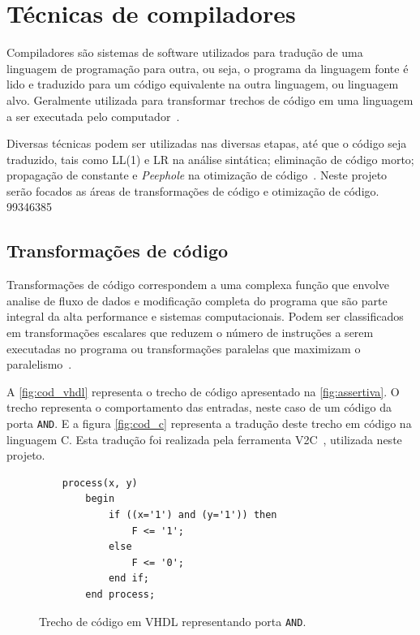 
\section{Técnicas de compiladores}
\par
Compiladores são sistemas de software utilizados para tradução de uma linguagem de programação para outra, ou seja, o programa da linguagem fonte é lido e traduzido para um código equivalente na outra linguagem, ou linguagem alvo. Geralmente utilizada para transformar trechos de código em uma linguagem a ser executada pelo computador~\cite{aho2007compilers}. 

\par
Diversas técnicas podem ser utilizadas nas diversas etapas, até que o código seja traduzido, tais como LL(1) e LR na análise sintática; eliminação de código morto; propagação de constante e \textit{Peephole} na otimização de código~\cite{aho2007compilers}. Neste projeto serão focados as áreas de transformações de código e otimização de código.
99346385
\subsection{Transformações de código}
\par
Transformações de código correspondem a uma complexa função que envolve analise de fluxo de dados e modificação completa do programa que são parte integral da alta performance e sistemas computacionais. Podem ser classificados em transformações escalares que reduzem o número de instruções a serem executadas no programa ou transformações paralelas que maximizam o paralelismo~\cite{srikant2002compiler}.

\par
A \autoref{fig:cod_vhdl} representa o trecho de código apresentado na \autoref{fig:assertiva}. O trecho representa o comportamento das entradas, neste caso de um código da porta \texttt{AND}. E a figura \autoref{fig:cod_c} representa a tradução deste trecho em código na linguagem C. Esta tradução foi realizada pela ferramenta V2C~\cite{albertoV2C}, utilizada neste projeto.

\begin{figure}[thp]
\caption{\label{fig:cod_vhdl} Trecho de código em VHDL representando porta \texttt{AND}.}
	\begin{center}
    \begin{minipage}{0.9\textwidth}
    \begin{lstlisting}       
	process(x, y)
    	begin
        	if ((x='1') and (y='1')) then
            	F <= '1';
        	else
            	F <= '0';
        	end if;
    	end process;
\end{lstlisting}
    \end{minipage}
	\end{center}
\end{figure}

